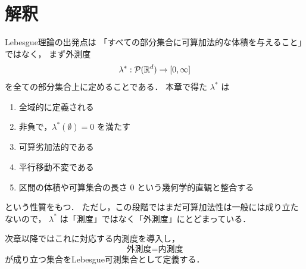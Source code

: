 \section{解釈}

Lebesgue理論の出発点は
「すべての部分集合に可算加法的な体積を与えること」ではなく，
まず外測度
\[
\lambda^* : \mathcal P(\mathbb R^d) \to [0,\infty]
\]
を全ての部分集合上に定めることである．
本章で得た $\lambda^*$ は
\begin{enumerate}
    \item 全域的に定義される
    \item 非負で，$\lambda^*(\emptyset)=0$ を満たす
    \item 可算劣加法的である
    \item 平行移動不変である
    \item 区間の体積や可算集合の長さ $0$ という幾何学的直観と整合する
\end{enumerate}
という性質をもつ．
ただし，この段階ではまだ可算加法性は一般には成り立たないので，
$\lambda^*$ は「測度」ではなく「外測度」にとどまっている．

次章以降ではこれに対応する内測度を導入し，
\[
\text{外測度}=\text{内測度}
\]
が成り立つ集合をLebesgue可測集合として定義する．
